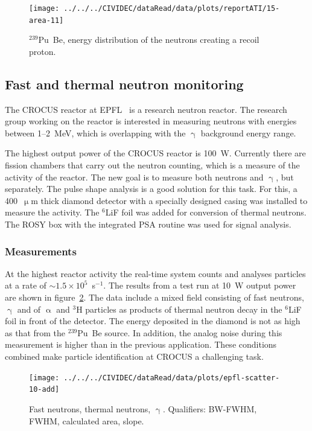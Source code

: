 \begin{figure}[!t]
\centering
\texttt{[image: ../../../CIVIDEC/dataRead/data/plots/reportATI/15-area-11]}
\caption{$^{239}$Pu~Be, energy distribution of the neutrons creating a recoil proton.}
\label{fig:scatterpuarea}
\end{figure}








\clearpage
\subsection{Fast and thermal neutron monitoring}
The CROCUS reactor at EPFL~\cite{EPFL:00000} is a research neutron reactor. The research group working on the reactor is interested in measuring neutrons with energies between 1--2~MeV, which is overlapping with the $\upgamma$ background energy range.

The highest output power of the CROCUS reactor is 100~W. Currently there are fission chambers that carry out the neutron counting, which is a measure of the activity of the reactor. The new goal is to measure both neutrons and $\upgamma$, but separately. The pulse shape analysis is a good solution for this task. For this, a 400~$\upmu$m thick diamond detector with a specially designed casing was installed to measure the activity. The $^6$LiF foil was added for conversion of thermal neutrons. The ROSY box with the integrated PSA routine was used for signal analysis.

\subsubsection{Measurements}
At the highest reactor activity the real-time system counts and analyses particles at a rate of $\sim1.5\times10^{5}$~s$^{-1}$. The results from a test run at 10~W output power are shown in figure~\ref{fig:scatterepfl2}. The data include a mixed field consisting of fast neutrons, $\upgamma$ and of $\upalpha$ and $^3$H particles as products of thermal neutron decay in the $^6$LiF foil in front of the detector. The energy deposited in the diamond is not as high as that from the $^{239}$Pu~Be source. In addition, the analog noise during this measurement is higher than in the previous application. These conditions combined make particle identification at CROCUS a challenging task.


\clearpage
\begin{figure}[]
\centering
\texttt{[image: ../../../CIVIDEC/dataRead/data/plots/epfl-scatter-10-add]}
\caption{Fast neutrons, thermal neutrons, $\upgamma$. Qualifiers: BW-FWHM, FWHM, calculated area, slope.}
\label{fig:scatterepfl2}
\end{figure}

